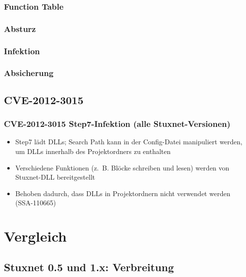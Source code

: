 \documentclass{beamer}
\begin{document}
\begin{frame}
  \frametitle{Function Table}
  
\end{frame}

\begin{frame}
  \frametitle{Absturz}
  
\end{frame}

\begin{frame}
  \frametitle{Infektion}
  
\end{frame}

\begin{frame}
  \frametitle{Absicherung}
  
\end{frame}

\subsection{CVE-2012-3015}

\begin{frame}
  \frametitle{CVE-2012-3015 Step7-Infektion (alle Stuxnet-Versionen)}
  \begin{itemize}
    \item Step7 lädt DLLs; Search Path kann in der Config-Datei manipuliert werden, um DLLs innerhalb des Projektordners zu enthalten
    \item Verschiedene Funktionen (z.~B. Blöcke schreiben und lesen) werden von Stuxnet-DLL bereitgestellt
    \item Behoben dadurch, dass DLLs in Projektordnern nicht verwendet werden (SSA-110665)
  \end{itemize}
\end{frame}

\section{Vergleich}

\subsection{Stuxnet 0.5 und 1.x: Verbreitung}
\end{document}
